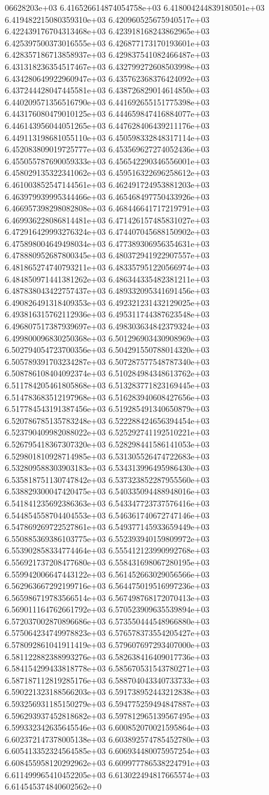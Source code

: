 06628203e+03	6.416526614874054758e+03	6.418004244839180501e+03	6.419482215080359310e+03	6.420960525675940517e+03	6.422439176704313468e+03	6.423918168243862965e+03	6.425397500373016555e+03	6.426877173170193601e+03	6.428357186713858937e+03	6.429837541082466487e+03	6.431318236354517467e+03	6.432799272608503998e+03	6.434280649922960947e+03	6.435762368376424092e+03	6.437244428047445581e+03	6.438726829014614850e+03	6.440209571356516790e+03	6.441692655151775398e+03	6.443176080479010125e+03	6.444659847416884077e+03	6.446143956044051265e+03	6.447628406439211176e+03	6.449113198681055110e+03	6.450598332848317114e+03	6.452083809019725777e+03	6.453569627274052436e+03	6.455055787690059333e+03	6.456542290346556001e+03	6.458029135322341062e+03	6.459516322696258612e+03	6.461003852547144561e+03	6.462491724953881203e+03	6.463979939995344466e+03	6.465468497750433926e+03	6.466957398298082808e+03	6.468446641717219791e+03	6.469936228086814481e+03	6.471426157485831027e+03	6.472916429993276324e+03	6.474407045688150902e+03	6.475898004649498034e+03	6.477389306956354631e+03	6.478880952687800345e+03	6.480372941922907557e+03	6.481865274740793211e+03	6.483357951220566974e+03	6.484850971441381262e+03	6.486344335482381211e+03	6.487838043422757437e+03	6.489332095341691456e+03	6.490826491318409353e+03	6.492321231432129025e+03	6.493816315762112936e+03	6.495311744387623548e+03	6.496807517387939697e+03	6.498303634842379324e+03	6.499800096830250368e+03	6.501296903430908969e+03	6.502794054723700356e+03	6.504291550788014320e+03	6.505789391703234287e+03	6.507287577548787340e+03	6.508786108404092374e+03	6.510284984348613762e+03	6.511784205461805868e+03	6.513283771823169445e+03	6.514783683512197968e+03	6.516283940608427656e+03	6.517784543191387456e+03	6.519285491340650879e+03	6.520786785135783248e+03	6.522288424656394454e+03	6.523790409982088022e+03	6.525292741192510221e+03	6.526795418367307320e+03	6.528298441586141053e+03	6.529801810928714985e+03	6.531305526474722683e+03	6.532809588303903183e+03	6.534313996495986430e+03	6.535818751130747842e+03	6.537323852287955560e+03	6.538829300047420475e+03	6.540335094488948016e+03	6.541841235692386363e+03	6.543347723737576416e+03	6.544854558704404553e+03	6.546361740672747146e+03	6.547869269722527861e+03	6.549377145933659449e+03	6.550885369386103775e+03	6.552393940159809972e+03	6.553902858334774464e+03	6.555412123990992768e+03	6.556921737208477680e+03	6.558431698067280195e+03	6.559942006647443122e+03	6.561452663029056566e+03	6.562963667292199716e+03	6.564475019516997236e+03	6.565986719783566514e+03	6.567498768172070413e+03	6.569011164762661792e+03	6.570523909635539894e+03	6.572037002870896686e+03	6.573550444548966880e+03	6.575064234749978823e+03	6.576578373554205427e+03	6.578092861041911419e+03	6.579607697293407000e+03	6.581122882388993276e+03	6.582638416409017736e+03	6.584154299433818778e+03	6.585670531543780271e+03	6.587187112819285176e+03	6.588704043340733733e+03	6.590221323188566203e+03	6.591738952443212838e+03	6.593256931185150279e+03	6.594775259494847887e+03	6.596293937452818682e+03	6.597812965139567495e+03	6.599332342635645546e+03	6.600852070021595864e+03	6.602372147378005138e+03	6.603892574785452780e+03	6.605413352324564585e+03	6.606934480075957254e+03	6.608455958120292962e+03	6.609977786538224791e+03	6.611499965410452205e+03	6.613022494817665574e+03	6.614545374840602562e+0